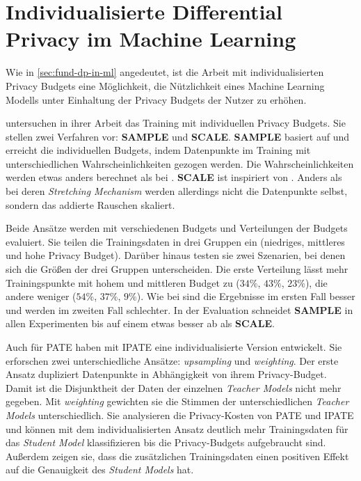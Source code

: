 \section{Individualisierte Differential Privacy im Machine Learning}\label{sec:rw-idp-ml}

Wie in \autoref{sec:fund-dp-in-ml} angedeutet, ist die Arbeit mit individualisierten Privacy Budgets eine Möglichkeit, die Nützlichkeit eines Machine Learning Modells unter Einhaltung der Privacy Budgets der Nutzer zu erhöhen.

\textcite{boenisch:2023} untersuchen in ihrer Arbeit das Training mit individuellen Privacy Budgets. Sie stellen zwei Verfahren vor: \textbf{SAMPLE} und \textbf{SCALE}. \textbf{SAMPLE} basiert auf \textcite{jorgensen:2015} und erreicht die individuellen Budgets, indem Datenpunkte im Training mit unterschiedlichen Wahrscheinlichkeiten gezogen werden. Die Wahrscheinlichkeiten werden etwas anders berechnet als bei \textcite{jorgensen:2015}. \textbf{SCALE} ist inspiriert von \textcite{alaggan:2016}. Anders als bei deren \textit{Stretching Mechanism} werden allerdings nicht die Datenpunkte selbst, sondern das addierte Rauschen skaliert. 

Beide Ansätze werden mit verschiedenen Budgets und Verteilungen der Budgets evaluiert. Sie teilen die Trainingsdaten in drei Gruppen ein (niedriges, mittleres und hohe Privacy Budget). Darüber hinaus testen sie zwei Szenarien, bei denen sich die Größen der drei Gruppen unterscheiden. Die erste Verteilung lässt mehr Trainingspunkte mit hohem und mittleren Budget zu ($34\%$, $43\%$, $23\%$), die andere weniger ($54\%$, $37\%$, $9\%$). Wie bei \textcite{jorgensen:2015} sind die Ergebnisse im ersten Fall besser und werden im zweiten Fall schlechter. In der Evaluation schneidet \textbf{SAMPLE} in allen Experimenten bis auf einem etwas besser ab als \textbf{SCALE}.

Auch für PATE haben \textcite{boenisch:2023b} mit IPATE eine individualisierte Version entwickelt. Sie erforschen zwei unterschiedliche Ansätze: \textit{upsampling} und \textit{weighting}. Der erste Ansatz dupliziert Datenpunkte in Abhängigkeit von ihrem Privacy-Budget. Damit ist die Disjunktheit der Daten der einzelnen \textit{Teacher Models} nicht mehr gegeben. Mit \textit{weighting} gewichten sie die Stimmen der unterschiedlichen \textit{Teacher Models} unterschiedlich. Sie analysieren die Privacy-Kosten von PATE und IPATE und können mit dem individualisierten Ansatz deutlich mehr Trainingsdaten für das \textit{Student Model} klassifizieren bis die Privacy-Budgets aufgebraucht sind. Außerdem zeigen sie, dass die zusätzlichen Trainingsdaten einen positiven Effekt auf die Genauigkeit des \textit{Student Models} hat.

